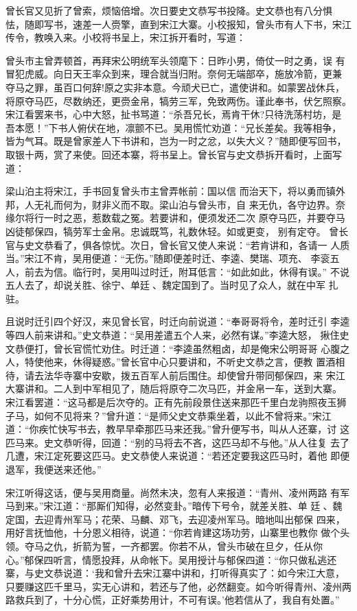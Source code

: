 曾长官又见折了曾索，烦恼倍增。次日要史文恭写书投降。史文恭也有八分惧
怯，随即写书，速差一人赍擎，直到宋江大寨。小校报知，曾头市有人下书，宋江
传令，教唤入来。小校将书呈上，宋江拆开看时，写道：

曾头市主曾弄顿首，再拜宋公明统军头领麾下：日昨小男，倚仗一时之勇，误
有冒犯虎威。向日天王率众到来，理合就当归附。奈何无端部卒，施放冷箭，更兼
夺马之罪，虽百口何辞!原之实非本意。今顽犬已亡，遣使讲和。如蒙罢战休兵，
将原夺马匹，尽数纳还，更赍金帛，犒劳三军，免致两伤。谨此奉书，伏乞照察。
宋江看罢来书，心中大怒，扯书骂道：“杀吾兄长，焉肯干休?只待洗荡村坊，是
吾本愿！”下书人俯伏在地，凛颤不已。吴用慌忙劝道：“兄长差矣。我等相争，
皆为气耳。既是曾家差人下书讲和，岂为一时之忿，以失大义？”随即便写回书，
取银十两，赏了来使。回还本寨，将书呈上。曾长官与史文恭拆开看时，上面写道：

梁山泊主将宋江，手书回复曾头市主曾弄帐前：国以信
而治天下，将以勇而镇外邦，人无礼而何为，财非义而不取。梁山泊与曾头市，自
来无仇，各守边界。奈缘尔将行一时之恶，惹数载之冤。若要讲和，便须发还二次
原夺马匹，并要夺马凶徒郁保四，犒劳军士金帛。忠诚既笃，礼数休轻。如或更变，
别有定夺。
曾长官与史文恭看了，俱各惊忧。次日，曾长官又使人来说：“若肯讲和，各请一
人质当。”宋江不肯，吴用便道：“无伤。”随即便差时迁、李逵、樊瑞、项充、
李衮五人，前去为信。临行时，吴用叫过时迁，附耳低言：“如此如此，休得有误。”
不说五人去了，却说关胜、徐宁、单廷、魏定国到了。当时见了众人，就在中军
扎驻。

且说时迁引四个好汉，来见曾长官，时迁向前说道：“奉哥哥将令，差时迁引
李逵等四人前来讲和。”史文恭道：“吴用差遣五个人来，必然有谋。”李逵大怒，
揪住史文恭便打，曾长官慌忙劝住。时迁道：“李逵虽然粗卤，却是俺宋公明哥哥
心腹之人，特使他来，休得疑惑。”曾长官中心只要讲和，不听史文恭之言，便教
置酒相待，请去法华寺寨中安歇，拨五百军人前后围住。却使曾升带同郁保四，来
宋江大寨讲和。二人到中军相见了，随后将原夺二次马匹，并金帛一车，送到大寨。
宋江看罢道：“这马都是后次夺的。正有先前段景住送来那匹千里白龙驹照夜玉狮
子马，如何不见将来？”曾升道：“是师父史文恭乘坐着，以此不曾将来。”宋江
道：“你疾忙快写书去，教早早牵那匹马来还我。”曾升便写书，叫从人还寨，讨
这匹马来。史文恭听得，回道：“别的马将去不吝，这匹马却不与他。”从人往复
去了几遭，宋江定死要这匹马。史文恭使人来说道：“若还定要我这匹马时，着他
即便退军，我便送来还他。”

宋江听得这话，便与吴用商量。尚然未决，忽有人来报道：“青州、凌州两路
有军马到来。”宋江道：“那厮们知得，必然变卦。”暗传下号令，就差关胜、单
廷、魏定国，去迎青州军马；花荣、马麟、邓飞，去迎凌州军马。暗地叫出郁保
四来，用好言抚恤他，十分恩义相待，说道：“你若肯建这场功劳，山寨里也教你
做个头领。夺马之仇，折箭为誓，一齐都罢。你若不从，曾头市破在旦夕，任从你
心。”郁保四听言，情愿投拜，从命帐下。吴用授计与郁保四道：“你只做私逃还
寨，与史文恭说道：‘我和曾升去宋江寨中讲和，打听得真实了：如今宋江大意，
只要赚这匹千里马，实无心讲和，若还与了他，必然翻变。如今听得青州、凌州两
路救兵到了，十分心慌，正好乘势用计，不可有误。’他若信从了，我自有处置。”

